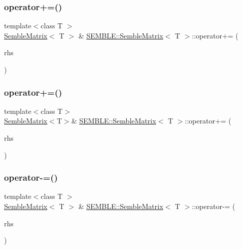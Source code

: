 \subsubsection{\texorpdfstring{operator+=()}{operator+=()}\hspace{0.1cm}{\footnotesize\ttfamily [3/4]}}
{\footnotesize\ttfamily template$<$class T $>$ \\
\mbox{\hyperlink{structSEMBLE_1_1SembleMatrix}{Semble\+Matrix}}$<$ T $>$ \& \mbox{\hyperlink{structSEMBLE_1_1SembleMatrix}{S\+E\+M\+B\+L\+E\+::\+Semble\+Matrix}}$<$ T $>$\+::operator+= (\begin{DoxyParamCaption}\item[{const itpp\+::\+Mat$<$ T $>$ \&}]{rhs }\end{DoxyParamCaption})}

\mbox{\label{structSEMBLE_1_1SembleMatrix_a88d796467ab566d47c31aa9bbff09356}} 
\subsubsection{\texorpdfstring{operator+=()}{operator+=()}\hspace{0.1cm}{\footnotesize\ttfamily [4/4]}}
{\footnotesize\ttfamily template$<$class T$>$ \\
\mbox{\hyperlink{structSEMBLE_1_1SembleMatrix}{Semble\+Matrix}}$<$T$>$\& \mbox{\hyperlink{structSEMBLE_1_1SembleMatrix}{S\+E\+M\+B\+L\+E\+::\+Semble\+Matrix}}$<$ T $>$\+::operator+= (\begin{DoxyParamCaption}\item[{const itpp\+::\+Mat$<$ T $>$ \&}]{rhs }\end{DoxyParamCaption})}

\mbox{\label{structSEMBLE_1_1SembleMatrix_a61af6d42338efa84f4ed2456c4799445}} 
\subsubsection{\texorpdfstring{operator-\/=()}{operator-=()}\hspace{0.1cm}{\footnotesize\ttfamily [1/4]}}
{\footnotesize\ttfamily template$<$class T $>$ \\
\mbox{\hyperlink{structSEMBLE_1_1SembleMatrix}{Semble\+Matrix}}$<$ T $>$ \& \mbox{\hyperlink{structSEMBLE_1_1SembleMatrix}{S\+E\+M\+B\+L\+E\+::\+Semble\+Matrix}}$<$ T $>$\+::operator-\/= (\begin{DoxyParamCaption}\item[{const \mbox{\hyperlink{structSEMBLE_1_1SembleMatrix}{Semble\+Matrix}}$<$ T $>$ \&}]{rhs }\end{DoxyParamCaption})}

